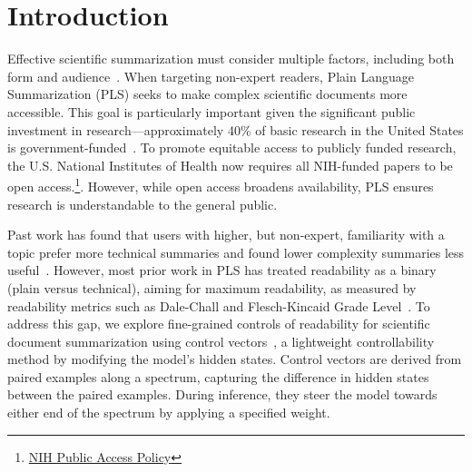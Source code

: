 

\section{Introduction}


Effective scientific summarization must consider multiple factors, including both form and audience~\cite{cohan-etal-2022-overview-first,ScisummNet.v33i01.33017386,BioLaySumm_2024}. When targeting non-expert readers, Plain Language Summarization (PLS) seeks to make complex scientific documents more accessible. This goal is particularly important given the significant public investment in research—approximately 40\% of basic research in the United States is government-funded~\cite{Pece_Anderson_2024}. To promote equitable access to publicly funded research, the U.S. National Institutes of Health now requires all NIH-funded papers to be open access.\footnote{\href{https://grants.nih.gov/policy-and-compliance/policy-topics/public-access/nih-public-access-policy-overview}{NIH
 Public Access Policy}}. However, while open access broadens availability, PLS ensures research is understandable to the general public.


Past work has found that users with higher, but non-expert, familiarity with a topic prefer more technical summaries and found lower complexity summaries less useful~\cite{August2024KnowYA}. However, most prior work in PLS has treated readability as a binary (plain versus technical), aiming for maximum readability, as measured by readability metrics such as Dale-Chall and Flesch-Kincaid Grade Level~\cite{Guo2020AutomatedLL,goldsack2022making,dale1948formula,tanprasert-kauchak-2021-flesch}. To address this gap, we explore fine-grained controls of readability for scientific document summarization using control vectors~\cite{zou2025representationengineeringtopdownapproach, rimsky-etal-2024-steering}, a lightweight controllability method by modifying the model's hidden states. Control vectors are derived from paired examples along a spectrum, capturing the difference in hidden states between the paired examples. During inference, they steer the model towards either end of the spectrum by applying a specified weight. 


